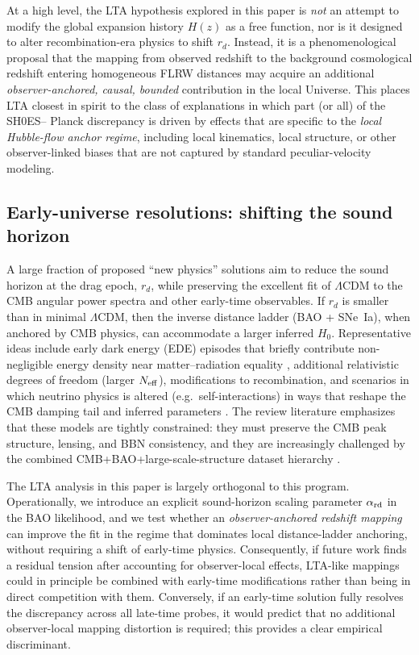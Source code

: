 \documentclass[10pt]{article}
\begin{document}
At a high level, the LTA hypothesis explored in this paper is \emph{not} an attempt to modify the
global expansion history $H(z)$ as a free function, nor is it designed to alter recombination-era
physics to shift $r_d$.
Instead, it is a phenomenological proposal that the mapping from observed redshift to the
background cosmological redshift entering homogeneous FLRW distances may acquire an additional
\emph{observer-anchored, causal, bounded} contribution in the local Universe.
This places LTA closest in spirit to the class of explanations in which part (or all) of the SH0ES--
Planck discrepancy is driven by effects that are specific to the \emph{local Hubble-flow anchor
regime}, including local kinematics, local structure, or other observer-linked biases that are not
captured by standard peculiar-velocity modeling.

\subsection{Early-universe resolutions: shifting the sound horizon}
A large fraction of proposed ``new physics'' solutions aim to reduce the sound horizon at the drag
epoch, $r_d$, while preserving the excellent fit of $\Lambda$CDM to the CMB angular power spectra
and other early-time observables.
If $r_d$ is smaller than in minimal $\Lambda$CDM, then the inverse distance ladder (BAO + SNe~Ia),
when anchored by CMB physics, can accommodate a larger inferred $H_0$.
Representative ideas include early dark energy (EDE) episodes that briefly contribute non-negligible
energy density near matter--radiation equality \cite{Poulin2019EDE}, additional relativistic degrees
of freedom (larger $N_{\rm eff}$), modifications to recombination, and scenarios in which neutrino
physics is altered (e.g.\ self-interactions) in ways that reshape the CMB damping tail and inferred
parameters \cite{Kreisch2019NeutrinoPuzzle}.
The review literature emphasizes that these models are tightly constrained: they must preserve the
CMB peak structure, lensing, and BBN consistency, and they are increasingly challenged by the
combined CMB+BAO+large-scale-structure dataset hierarchy \cite{DiValentino2021Review}.

The LTA analysis in this paper is largely orthogonal to this program.
Operationally, we introduce an explicit sound-horizon scaling parameter $\alpha_{\rm rd}$ in the BAO
likelihood, and we test whether an \emph{observer-anchored redshift mapping} can improve the fit in
the regime that dominates local distance-ladder anchoring, without requiring a shift of early-time
physics.
Consequently, if future work finds a residual tension after accounting for observer-local effects,
LTA-like mappings could in principle be combined with early-time modifications rather than being in
direct competition with them.
Conversely, if an early-time solution fully resolves the discrepancy across all late-time probes,
it would predict that no additional observer-local mapping distortion is required; this provides a
clear empirical discriminant.
\end{document}
